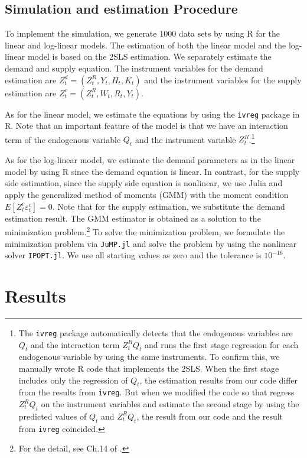 \documentclass[11pt, a4paper]{article}
\begin{document}
\subsection{Simulation and estimation Procedure}

To implement the simulation, we generate 1000 data sets by using R for the linear and log-linear models.
The estimation of both the linear model and the log-linear model is based on the 2SLS estimation. 
We separately estimate the demand and supply equation.
The instrument variables for the demand estimation are $Z^{d}_{t} = (Z^{R}_{t}, Y_t, H_{t}, K_{t})$ and the instrument variables for the supply estimation are $Z^{c}_{t} = (Z^{R}_{t}, W_{t}, R_t, Y_t)$.

As for the linear model, we estimate the equations by using the \texttt{ivreg} package in R.
Note that an important feature of the model is that we have an interaction term of the endogenous variable $Q_t$ and the instrument variable $Z^{R}_{t}$.\footnote{The \texttt{ivreg} package automatically detects that the endogenous variables are $Q_t$ and the interaction term $Z^{R}_{t}Q_t$ and runs the first stage regression for each endogenous variable by using the same instruments. To confirm this, we manually wrote R code that implements the 2SLS. 
When the first stage includes only the regression of $Q_t$, the estimation results from our code differ from the results from \texttt{ivreg}. 
But when we modified the code so that regress $Z^{R}_{t}Q_t$ on the instrument variables and estimate the second stage by using the predicted values of $Q_t$ and $Z^{R}_{t}Q_t$, the result from our code and the result from \texttt{ivreg} coincided.}

As for the log-linear model, we estimate the demand parameters as in the linear model by using R since the demand equation is linear.
In contrast, for the supply side estimation, since the supply side equation is nonlinear, we use Julia and apply the generalized method of moments (GMM) with the moment condition $E[Z^{c}_{t} \varepsilon^{c}_{t}] = 0$.
Note that for the supply estimation, we substitute the demand estimation result.
The GMM estimator is obtained as a solution to the minimization problem.\footnote{For the detail, see Ch.14 of \citet{wooldridge2010econometric}.}
To solve the minimization problem, we formulate the minimization problem via \texttt{JuMP.jl} and solve the problem by using the nonlinear solver \texttt{IPOPT.jl}. We use all starting values as zero and the tolerance is $10^{-16}$.

\section{Results}
\end{document}

